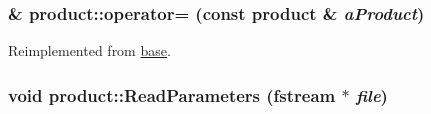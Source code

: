 \label{classproduct_aad3b7e2ec5a3a9dfe3199ea7575a4f8f}
\hypertarget{classproduct_afa55a9466d7f5a287bae17100289733e}{
\subsubsection[{operator=}]{ \& product::operator= (const {\bf product} \& {\em aProduct})}}
\label{classproduct_afa55a9466d7f5a287bae17100289733e}


Reimplemented from \hyperlink{classbase_abd18e2130f975aacfde1833ad137e3c5}{base}.\hypertarget{classproduct_a1edb3e3d0619a2db8b8f1c95fed582ce}{
\subsubsection[{ReadParameters}]{\setlength{\rightskip}{0pt plus 5cm}void product::ReadParameters (fstream $\ast$ {\em file})}}
\label{classproduct_a1edb3e3d0619a2db8b8f1c95fed582ce}


